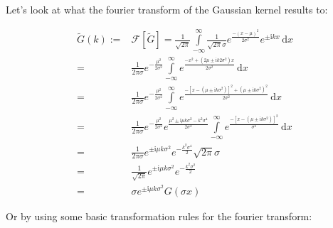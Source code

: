 \documentclass[10pt,a4paper]{article}
\begin{document}
Let's look at what the fourier transform of the Gaussian kernel results to:

\begin{align}
\tilde{G}(k)
   := & \mathcal{F}\left[ \tilde{G} \right]
    =   \frac{1}{\sqrt{2\pi}}
        \int\limits_{-\infty}^{\infty} \frac{1}{\sqrt{2\pi}\sigma}
            e^{ \frac{-\left( x - \mu  \right)^2}{2\sigma^2} }
            e^{ \pm \mathrm{i}kx}
        \,\mathrm{d}x \\
    = & \frac{1}{ 2\pi\sigma } e^{-\frac{\mu^2}{2\sigma^2} }
        \int\limits_{-\infty}^{\infty}
            e^{ \frac{ -x^2 + \left(2\mu \pm \mathrm{i}k 2\sigma^2 \right)x}
                    {2\sigma^2} }
        \,\mathrm{d}x \\
    = & \frac{1}{ 2\pi\sigma } e^{-\frac{\mu^2}{2\sigma^2} }
        \int\limits_{-\infty}^{\infty}
            e^{ \frac{ -\left[ x - \left(\mu \pm
                              \mathrm{i}k\sigma^2 \right)
                       \right]^2 +
                       \left(\mu \pm \mathrm{i}k\sigma^2 \right)^2 }
                    {2\sigma^2}
              }
        \,\mathrm{d}x \\
    = & \frac{1}{ 2\pi\sigma } e^{-\frac{\mu^2}{2\sigma^2}}
        e^{\frac{ \mu^2 \pm \mathrm{i} \mu k \sigma^2 -
                  k^2\sigma^4 }{ 2 \sigma^2} }
        \int\limits_{-\infty}^{\infty}
            e^{ \frac{ -\left[ x - \left(\mu \pm
                \mathrm{i}k\sigma^2 \right) \right]^2}{\sigma^2} }
        \,\mathrm{d}x \\
    = & \frac{1}{ 2\pi\sigma }
        e^{ \pm \mathrm{i} \mu k \sigma^2 }
        e^{ -\frac{ k^2\sigma^4 }{ 2 } }
        \sqrt{ 2\pi } \sigma \\
    = & \frac{1}{ \sqrt{2\pi} }
        e^{ \pm \mathrm{i} \mu k \sigma^2  }
        e^{ -\frac{ k^2\sigma^2 }{ 2 } } \\
    = & \sigma e^{ \pm \mathrm{i} \mu k \sigma^2  } G\left( \sigma x \right)
\end{align}

Or by using some basic transformation rules for the fourier transform:
\end{document}
